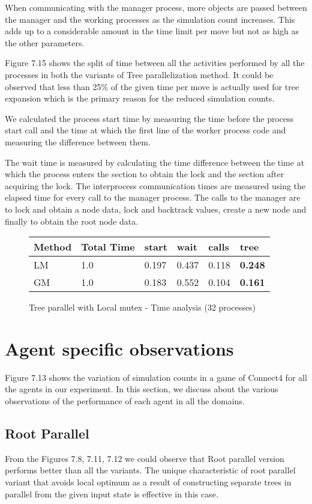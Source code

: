 \documentclass[double,12pt]{beavtex}
\begin{document}
When communicating with the manager process, more objects are passed between the manager and the working processes as the simulation count increases. This adds up to a considerable amount in the time limit per move but not as high as the other parameters. 

Figure 7.15 shows the split of time between all the activities performed by all the processes in both the variants of Tree parallelization method. It could be observed that less than 25\% of the given time per move is actually used for tree expansion which is the primary reason for the reduced simulation counts. 

We calculated the process start time by measuring the time before the process start call and the time at which the first line of the worker process code and measuring the difference between them. 

The wait time is measured by calculating the time difference between the time at which the process enters the section to obtain the lock and the section after acquiring the lock. The interprocess communication times are measured using the elapsed time for every call to the manager process. The calls to the manager are to lock and obtain a node data, lock and backtrack values, create a new node and finally to obtain the root node data.

\begin{figure}[!ht]
\centering
\begin{tabular}{|p{2cm}||p{2cm}||p{2cm}|p{2cm}|p{2cm}|p{2cm}|} 
\hline
Method & Total Time & start & wait & calls & tree\\ 
\hline
LM & 1.0 & 0.197 & 0.437 & 0.118 & \textbf{0.248} \\ 
GM & 1.0 & 0.183 & 0.552 & 0.104 & \textbf{0.161} \\ 
\hline
\end{tabular}
\caption{Tree parallel with Local mutex - Time analysis (32 processes)}
\end{figure}

\section{Agent specific observations}
Figure 7.13 shows the variation of simulation counts in a game of Connect4 for all the agents in our experiment. In this section, we discuss about the  various observations of the performance of each agent in all the domains. 

\subsection{Root Parallel}
From the Figures 7.8, 7.11, 7.12 we could observe that Root parallel version performs better than all the variants. The unique characteristic of root parallel variant that avoids local optimum as a result of constructing separate trees in parallel from the given input state is effective in this case. 
\end{document}
